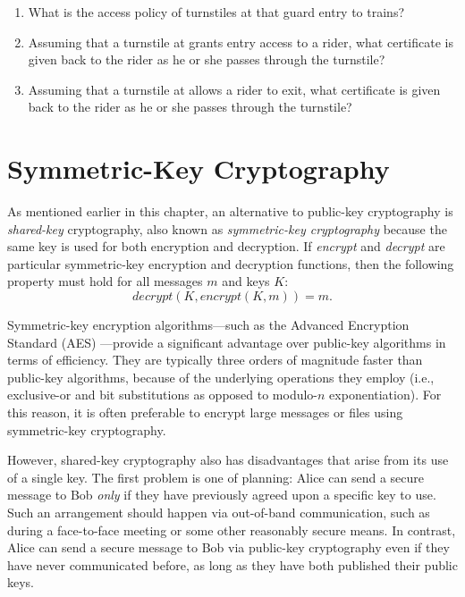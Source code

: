 \begin{exercise}[\synthesis]
\begin{enumerate}
  \item  What is the access policy of turnstiles at
     that guard entry to trains?

  \item Assuming that a turnstile at  grants entry
    access to a rider, what certificate is given back to the rider as he
    or she passes through the turnstile?

  \item Assuming that a turnstile at  allows
    a rider to exit, what certificate is given back to the rider as he
    or she passes through the turnstile? 
  \end{enumerate}

\end{exercise}

\section{Symmetric-Key Cryptography}

As mentioned earlier in this
chapter, an alternative to public-key cryptography is
 \emph{shared-key} cryptography, also known as
\emph{symmetric-key cryptography} because the same key is used for
both encryption and decryption.  If \emph{encrypt} and \emph{decrypt}
are particular symmetric-key encryption and decryption functions, then
the following property must hold for all messages $m$ and keys $K$:
\[ \mathit{decrypt}(K,\mathit{encrypt}(K,m))  =  m. \]

Symmetric-key encryption
algorithms---such as the Advanced Encryption Standard (AES)
\cite{AES}---provide a significant advantage over public-key
algorithms in terms of efficiency.  They are typically three orders of
magnitude faster than public-key algorithms, because of the underlying
operations they employ (i.e., exclusive-or and bit substitutions as
opposed to modulo-$n$ exponentiation).  For this reason, it is often
preferable to encrypt large messages or files using symmetric-key
cryptography.

However, shared-key cryptography also has disadvantages that arise
from its use of a single key.  The first problem is one of planning:
Alice can send a secure message to Bob \emph{only} if they have
previously agreed upon a specific key to use.  Such an arrangement
should happen via out-of-band communication, such as during a
face-to-face meeting or some other reasonably secure means.  In
contrast, Alice can send a secure message to Bob via public-key
cryptography even if they have never communicated before, as long as
they have both published their public keys.

